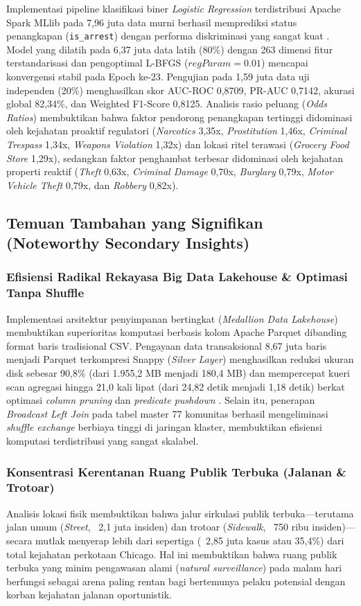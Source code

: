 \documentclass[11pt,a4paper]{article}
\begin{document}
Implementasi pipeline klasifikasi biner \textit{Logistic Regression} terdistribusi Apache Spark MLlib pada 7,96 juta data murni berhasil memprediksi status penangkapan (\texttt{is\_arrest}) dengan performa diskriminasi yang sangat kuat \cite{mandalapu2023, djon2023}. Model yang dilatih pada 6,37 juta data latih (80\%) dengan 263 dimensi fitur terstandarisasi dan pengoptimal L-BFGS ($regParam=0.01$) mencapai konvergensi stabil pada Epoch ke-23. Pengujian pada 1,59 juta data uji independen (20\%) menghasilkan skor AUC-ROC 0,8709, PR-AUC 0,7142, akurasi global 82,34\%, dan Weighted F1-Score 0,8125. Analisis rasio peluang (\textit{Odds Ratios}) membuktikan bahwa faktor pendorong penangkapan tertinggi didominasi oleh kejahatan proaktif regulatori (\textit{Narcotics} 3,35x, \textit{Prostitution} 1,46x, \textit{Criminal Trespass} 1,34x, \textit{Weapons Violation} 1,32x) dan lokasi ritel terawasi (\textit{Grocery Food Store} 1,29x), sedangkan faktor penghambat terbesar didominasi oleh kejahatan properti reaktif (\textit{Theft} 0,63x, \textit{Criminal Damage} 0,70x, \textit{Burglary} 0,79x, \textit{Motor Vehicle Theft} 0,79x, dan \textit{Robbery} 0,82x).

\subsection{Temuan Tambahan yang Signifikan (Noteworthy Secondary Insights)}

\subsubsection{Efisiensi Radikal Rekayasa Big Data Lakehouse \& Optimasi Tanpa Shuffle}
Implementasi arsitektur penyimpanan bertingkat (\textit{Medallion Data Lakehouse}) membuktikan superioritas komputasi berbasis kolom Apache Parquet dibanding format baris tradisional CSV. Pengayaan data transaksional 8,67 juta baris menjadi Parquet terkompresi Snappy (\textit{Silver Layer}) menghasilkan reduksi ukuran disk sebesar 90,8\% (dari 1.955,2 MB menjadi 180,4 MB) dan mempercepat kueri scan agregasi hingga 21,0 kali lipat (dari 24,82 detik menjadi 1,18 detik) berkat optimasi \textit{column pruning} dan \textit{predicate pushdown} \cite{zaharia2012}. Selain itu, penerapan \textit{Broadcast Left Join} pada tabel master 77 komunitas berhasil mengeliminasi \textit{shuffle exchange} berbiaya tinggi di jaringan klaster, membuktikan efisiensi komputasi terdistribusi yang sangat skalabel.

\subsubsection{Konsentrasi Kerentanan Ruang Publik Terbuka (Jalanan \& Trotoar)}
Analisis lokasi fisik membuktikan bahwa jalur sirkulasi publik terbuka—terutama jalan umum (\textit{Street}, ~2,1 juta insiden) dan trotoar (\textit{Sidewalk}, ~750 ribu insiden)—secara mutlak menyerap lebih dari sepertiga (~2,85 juta kasus atau 35,4\%) dari total kejahatan perkotaan Chicago. Hal ini membuktikan bahwa ruang publik terbuka yang minim pengawasan alami (\textit{natural surveillance}) pada malam hari berfungsi sebagai arena paling rentan bagi bertemunya pelaku potensial dengan korban kejahatan jalanan oportunistik.
\end{document}
